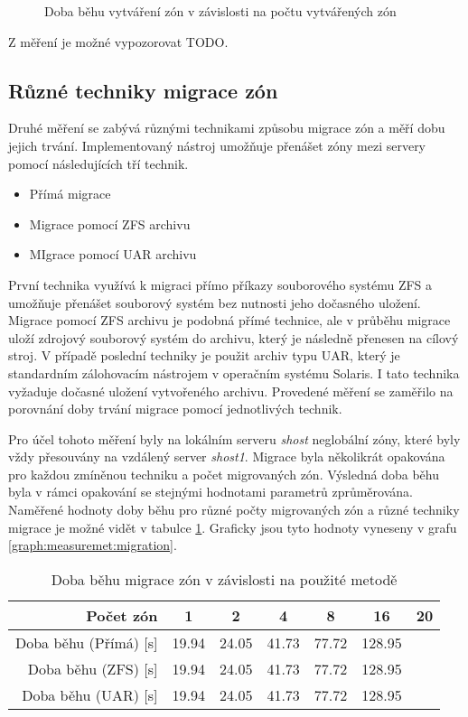 \begin{figure}
  \centering
  \label{graph:measuremet:creation}
  \caption{Doba běhu vytváření zón v závislosti na počtu vytvářených zón}
\end{figure}

Z měření je možné vypozorovat TODO.
\subsection{Různé techniky migrace zón}
\label{chapter:measurement:migration}
Druhé měření se zabývá různými technikami způsobu migrace zón a měří dobu jejich trvání. Implementovaný nástroj umožňuje přenášet zóny mezi
servery pomocí následujících tří technik.
\begin{itemize}
 \item Přímá migrace
 \item Migrace pomocí ZFS archivu
 \item MIgrace pomocí UAR archivu
\end{itemize}
První technika využívá k migraci přímo příkazy souborového systému ZFS a umožňuje přenášet souborový systém bez nutnosti jeho dočasného
uložení. Migrace pomocí ZFS archivu je podobná přímé technice, ale v průběhu migrace uloží zdrojový souborový systém do archivu,
který je následně přenesen na cílový stroj. V případě poslední techniky je použit archiv typu UAR, který je standardním zálohovacím
nástrojem v operačním systému Solaris. I tato technika vyžaduje dočasné uložení vytvořeného archivu. Provedené měření se zaměřilo
na porovnání doby trvání migrace pomocí jednotlivých technik.

Pro účel tohoto měření byly na lokálním serveru \textit{shost} neglobální zóny, které byly vždy přesouvány na vzdálený
server \textit{shost1}. Migrace byla několikrát opakována pro každou zmíněnou techniku a počet migrovaných zón. Výsledná
doba běhu byla v rámci opakování se stejnými hodnotami parametrů zprůměrována. Naměřené hodnoty doby běhu pro různé počty
migrovaných zón a různé techniky migrace je možné vidět v tabulce \ref{table:measuremet:migration}. Graficky jsou tyto
hodnoty vyneseny v grafu \ref{graph:measuremet:migration}.
\begin{table}
  \centering
  \label{table:measuremet:migration}
  \caption{Doba běhu migrace zón v závislosti na použité metodě}
  \begin{tabular}{ r | c c c c c c}
   Počet zón & 1 & 2 & 4 & 8 & 16 & 20  \\ \hline
   Doba běhu (Přímá) [s] & 19.94 & 24.05 & 41.73 & 77.72 & 128.95 & \\
   Doba běhu (ZFS) [s] & 19.94 & 24.05 & 41.73 & 77.72 & 128.95 & \\
   Doba běhu (UAR) [s] & 19.94 & 24.05 & 41.73 & 77.72 & 128.95 & \\
  \end{tabular}
\end{table}

